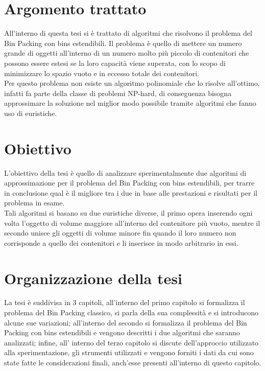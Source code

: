 {}
\section*{Argomento trattato}
All'interno di questa tesi si è trattato di algoritmi che risolvono il problema del Bin Packing con 
bins estendibili. Il problema è quello di mettere un numero grande di oggetti all'interno di 
un numero molto più piccolo di contenitori che possono essere estesi se la loro capacità viene superata, con lo scopo 
di minimizzare lo spazio vuoto e in eccesso totale dei contenitori. \\
Per questo problema non esiste un algoritmo polinomiale che lo risolve all'ottimo, infatti fa parte della
classe di problemi NP-hard, di conseguenza bisogna approssimare la soluzione nel miglior modo
possibile tramite algoritmi che fanno uso di euristiche.

{}
\section*{Obiettivo}
L'obiettivo della tesi è quello di analizzare sperimentalmente due algoritmi di approssimazione 
per il problema del Bin Packing con bins estendibili, per trarre in conclusione qual è il migliore tra i due 
in base alle prestazioni e risultati per il problema in esame. \\
Tali algoritmi si basano su due euristiche diverse, il primo opera inserendo ogni volta l'oggetto di volume 
maggiore all'interno del contenitore più vuoto, mentre il secondo unisce gli oggetti di volume minore 
fin quando il loro numero non corrisponde a quello dei contenitori e li inserisce in modo arbitrario in essi.

{}
\section*{Organizzazione della tesi}
La tesi è suddivisa in 3 capitoli, all'interno del primo capitolo si formalizza il problema del Bin Packing
classico, si parla della sua complessità e si introducono alcune sue variazioni; all'interno del secondo si formalizza
il problema del Bin Packing con bins estendibili e vengono descritti i due algoritmi che saranno analizzati; infine, all'
interno del terzo capitolo si discute dell'approccio utilizzato alla sperimentazione, gli strumenti utilizzati e vengono forniti i dati
da cui sono state fatte le considerazioni finali, anch'esse presenti all'interno di questo capitolo.
